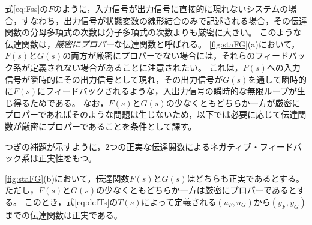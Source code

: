 \documentclass[tombow,dvipdfmx]{corona-a5}
\begin{document}
式\ref{eq:Fss}の$F$のように，入力信号が出力信号に直接的に現れないシステムの場合，すなわち，出力信号が状態変数の線形結合のみで記述される場合，その伝達関数の分母多項式の次数は分子多項式の次数よりも厳密に大きい。
このような伝達関数は，\emph{厳密にプロパー}な伝達関数と呼ばれる。
\ref{fig:staFG}(a)において，$F(s)$と$G(s)$の両方が厳密にプロパーでない場合には，それらのフィードバック系が定義されない場合があることに注意されたい。
これは，$F(s)$への入力信号が瞬時的にその出力信号として現れ，その出力信号が$G(s)$を通して瞬時的に$F(s)$にフィードバックされるような，入出力信号の瞬時的な無限ループが生じ得るためである。
なお，$F(s)$と$G(s)$の少なくともどちらか一方が厳密にプロパーであればそのような問題は生じないため，以下では必要に応じて伝達関数が厳密にプロパーであることを条件として課す。

つぎの補題が示すように，2つの正実な伝達関数によるネガティブ・フィードバック系は正実性をもつ。


\begin{補題}\label{lem:prpre}
\ref{fig:staFG}(b)において，伝達関数$F(s)$と$G(s)$はどちらも正実であるとする。
ただし，$F(s)$と$G(s)$の少なくともどちらか一方は厳密にプロパーであるとする。
このとき，式\ref{eq:defTs}の$T(s)$によって定義される$(u_F,u_G)$から$(y_F,y_G)$までの伝達関数は正実である。
\end{補題}
\end{document}
